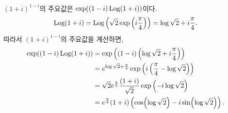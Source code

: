 $(1+i)^{1-i}$의 주요값은 $\exp((1-i)\mathop{\mathrm{Log}}(1+i))$이다.
\[
\mathop{\mathrm{Log}}(1+i)  = \mathop{\mathrm{Log}} \left( \sqrt{2}\exp\left(i \displaystyle\frac\pi4\right)\right)
= \log\sqrt{2} + i \displaystyle\frac\pi4.
\]
따라서 $(1+i)^{1-i}$의 주요값을 계산하면,
\begin{align*}
\exp((1-i)\mathop{\mathrm{Log}}(1+i)) &= \exp\left( (1-i)\left(\log\sqrt{2} + i \displaystyle\frac\pi4\right)\right) \\
&= e^{\log\sqrt{2} + \frac\pi4} \exp \left( i\left( \displaystyle\frac\pi4 - \log\sqrt{2} \right)\right) \\
&= \sqrt{2} e^{\frac\pi4} \displaystyle\frac{(1+i)}{\sqrt{2}} \exp\left(-i\log\sqrt{2}\right) \\
&=e^{\frac\pi4}(1+i)\left(\cos (\log\sqrt{2}) - i \sin(\log\sqrt{2})\right).
\end{align*}













